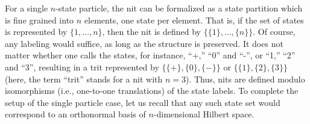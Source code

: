 For a single $n$-state particle, the nit can be formalized as a state partition
which is fine grained into $n$ elements, one state per element.
That is,
if the set of states is represented by $\{1,\ldots ,n\}$,
then the nit is defined by
$
\{\{1\} ,\ldots ,\{n\}\}.
$
Of course, any labeling would suffice, as long as the structure is preserved.
It does not matter
whether one calls the states, for instance, ``+,'' ``0'' and  ``-'', or ``1,'' ``2'' and ``3'',
resulting in a trit represented by
$\{\{+\} ,\{0\} ,\{-\}\}$ or
$\{\{1\} ,\{2\} ,\{3\}\}$
(here, the term ``trit'' stands for a nit with $n=3$).
Thus, nits are defined modulo isomorphisms (i.e., one-to-one translations)
of the state labels.
To complete the setup of the single particle case, let us
recall that any such state set would correspond to an orthonormal
basis of $n$-dimensional Hilbert space.


